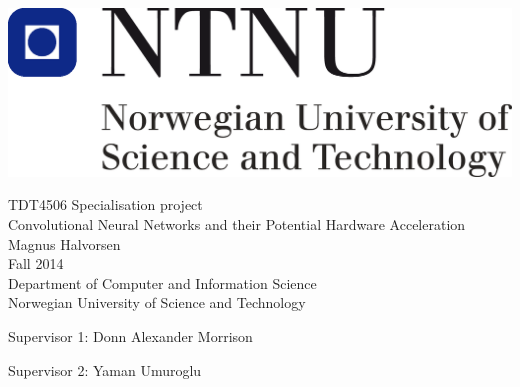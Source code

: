 \thispagestyle{empty}
\includegraphics[scale=0.3]{Figures/ntnu}
\mbox{}\\[6pc]
\begin{center}
\Large{TDT4506 Specialisation project}\\[1pc]
\Huge{Convolutional Neural Networks and their Potential Hardware Acceleration}\\[2pc]

\Large{Magnus Halvorsen}\\[1pc]
\large{Fall 2014}\\[2pc]


Department of Computer and Information Science\\
Norwegian University of Science and Technology
\end{center}
\vfill

\noindent Supervisor 1: Donn Alexander Morrison

\noindent Supervisor 2: Yaman Umuroglu